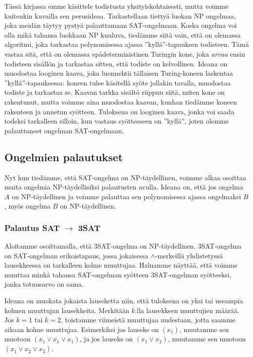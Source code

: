 Tässä kirjassa emme käsittele todistusta yksityiskohtaisesti,
mutta voimme kuitenkin kuvailla sen perusideaa.
Tarkastellaan tiettyä luokan NP ongelmaa,
joka meidän täytyy pystyä palauttamaan SAT-ongelmaan.
Koska ongelma voi olla mikä tahansa luokkaan NP kuuluva, tiedämme siitä vain,
että on olemassa algoritmi, joka tarkastaa
polynomisessa ajassa ''kyllä''-tapauksen todisteen.
Tämä vastaa sitä, että on olemassa epädeterministinen
Turingin kone, joka \emph{arvaa} ensin todisteen sisällön ja
tarkastaa sitten, että todiste on kelvollinen.
Ideana on muodostaa looginen kaava, joka luonnehtii tällaisen
Turing-koneen laskentaa ''kyllä''-tapauksessa:
koneen tulee käsitellä syöte jollakin tavalla,
muodostaa todiste ja tarkastaa se.
Kaavan tarkka sisältö riippuu siitä, miten kone on rakentunut,
mutta voimme aina muodostaa kaavan, kunhan tiedämme koneen rakenteen
ja annetun syötteen.
Tuloksena on looginen kaava, jonka voi saada todeksi tarkalleen silloin,
kun vastaus syötteeseen on ''kyllä'',
joten olemme palauttaneet ongelman SAT-ongelmaan.

\subsection{Ongelmien palautukset}

Nyt kun tiedämme, että SAT-ongelma on NP-täydellinen,
voimme alkaa osoittaa muita ongelmia NP-täydellisiksi palautusten avulla.
Ideana on, että jos ongelma $A$ on NP-täydellinen ja
voimme palauttaa sen polynomisessa ajassa ongelmaksi $B$,
myös ongelma $B$ on NP-täydellinen.

\subsubsection{Palautus SAT $\rightarrow$ 3SAT}

Aloitamme osoittamalla, että 3SAT-ongelma on NP-täydellinen.
3SAT-on\-gelma on SAT-ongelman erikoistapaus, jossa jokaisessa
$\land$-merkeillä yhdistetyssä lausekkeessa on tarkalleen kolme muuttujaa.
Haluamme näyttää, että voimme muuttaa minkä tahansa
SAT-ongelman syötteen 3SAT-ongelman syötteeksi,
jonka totuusarvo on sama.

Ideana on muokata jokaista lauseketta niin, 
että tuloksena on yksi tai useampia kolmen muuttujan lausekkeita.
Merkitään $k$:lla lausekkeen muuttujien määrää.
Jos $k=1$ tai $k=2$, toistamme viimeistä muuttujaa uudestaan,
jotta saamme aikaan kolme muuttujaa.
Esimerkiksi jos lauseke on $(x_1)$, muutamme sen muotoon
$(x_1 \lor x_1 \lor x_1)$, ja jos lauseke on $(x_1 \lor x_2)$, muutamme
sen muotoon $(x_1 \lor x_2 \lor x_2)$.

